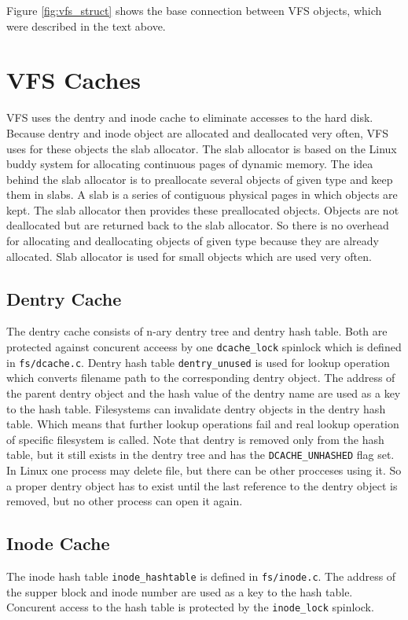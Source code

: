 Figure \ref{fig:vfs_struct} shows the base connection between VFS objects, which
were described in the text above.

\section{VFS Caches}
\label{lab:cache}
VFS uses the dentry and inode cache to eliminate accesses to the hard disk. Because dentry and
inode object are allocated and deallocated very often, VFS uses for these
objects the slab
allocator. The slab allocator is based on the Linux buddy system for allocating continuous
pages of dynamic memory. The idea behind the slab allocator is to preallocate several
objects of given type and keep them in slabs. A slab is a series of contiguous
physical pages in which objects are kept. The slab allocator then provides these
preallocated objects. Objects are not deallocated but are returned back to the slab
allocator. So there is no overhead for allocating and deallocating objects of given
type because they are already allocated. Slab allocator is used for small objects which
are used very often.

\subsection{Dentry Cache}
\label{lab:dentry_cache}
The dentry cache consists of n-ary dentry tree and dentry hash table. Both are protected
against concurent acceess by one \texttt{dcache\_lock} spinlock which is defined in
\texttt{fs/dcache.c}. Dentry hash table \texttt{dentry\_unused} is used for lookup
operation which converts filename path to the corresponding dentry object. The address of
the parent dentry object and the hash value of the dentry name are used as a key to the hash table.
Filesystems can invalidate dentry objects in the dentry hash table. Which means that
further lookup operations fail and real lookup operation of specific filesystem is
called. Note that dentry is removed only from the hash table, but it still
exists in the dentry
tree and has the \texttt{DCACHE\_UNHASHED} flag set. In Linux one process may delete file,
but there can be other procceses using it. So a proper dentry object has to exist until
the last reference to the dentry object is removed, but no other process can open it again. 

\subsection{Inode Cache}
\label{lab:inode_cache}
The inode hash table \texttt{inode\_hashtable} is defined in
\texttt{fs/inode.c}. The address
of the supper block and inode number are used as a key to the hash table. Concurent
access to the hash table is protected by the \texttt{inode\_lock} spinlock.

